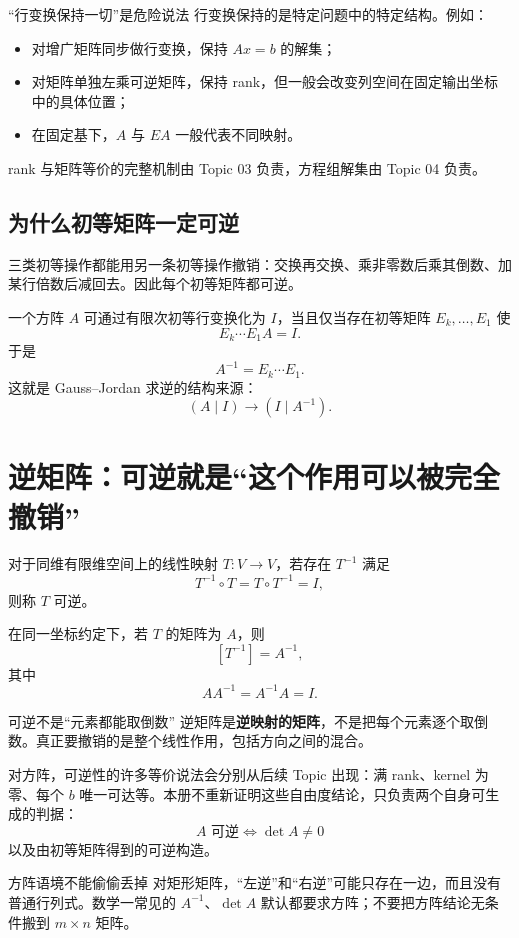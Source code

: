 \documentclass[11pt,a4paper]{ctexart}
\newcommand{\kw}[1]{\textbf{\color{deep}#1}}
\begin{document}
\begin{warnbox}{“行变换保持一切”是危险说法}
行变换保持的是特定问题中的特定结构。例如：
\begin{itemize}
  \item 对增广矩阵同步做行变换，保持 $Ax=b$ 的解集；
  \item 对矩阵单独左乘可逆矩阵，保持 rank，但一般会改变列空间在固定输出坐标中的具体位置；
  \item 在固定基下，$A$ 与 $EA$ 一般代表不同映射。
\end{itemize}
rank 与矩阵等价的完整机制由 Topic 03 负责，方程组解集由 Topic 04 负责。
\end{warnbox}

\subsection{为什么初等矩阵一定可逆}

三类初等操作都能用另一条初等操作撤销：交换再交换、乘非零数后乘其倒数、加某行倍数后减回去。因此每个初等矩阵都可逆。

一个方阵 $A$ 可通过有限次初等行变换化为 $I$，当且仅当存在初等矩阵 $E_k,\dots,E_1$ 使
\[
E_k\cdots E_1A=I.
\]
于是
\[
A^{-1}=E_k\cdots E_1.
\]
这就是 Gauss--Jordan 求逆的结构来源：
\[
(A\mid I)\longrightarrow(I\mid A^{-1}).
\]

\section{逆矩阵：可逆就是“这个作用可以被完全撤销”}

对于同维有限维空间上的线性映射 $T:V\to V$，若存在 $T^{-1}$ 满足
\[
T^{-1}\circ T=T\circ T^{-1}=I,
\]
则称 $T$ 可逆。

在同一坐标约定下，若 $T$ 的矩阵为 $A$，则
\[
[T^{-1}]=A^{-1},
\]
其中
\[
AA^{-1}=A^{-1}A=I.
\]

\begin{corebox}{可逆不是“元素都能取倒数”}
逆矩阵是\kw{逆映射的矩阵}，不是把每个元素逐个取倒数。真正要撤销的是整个线性作用，包括方向之间的混合。
\end{corebox}

对方阵，可逆性的许多等价说法会分别从后续 Topic 出现：满 rank、kernel 为零、每个 $b$ 唯一可达等。本册不重新证明这些自由度结论，只负责两个自身可生成的判据：
\[
\boxed{A\text{ 可逆}\iff \det A\neq0}
\]
以及由初等矩阵得到的可逆构造。

\begin{warnbox}{方阵语境不能偷偷丢掉}
对矩形矩阵，“左逆”和“右逆”可能只存在一边，而且没有普通行列式。数学一常见的 $A^{-1}$、$\det A$ 默认都要求方阵；不要把方阵结论无条件搬到 $m\times n$ 矩阵。
\end{warnbox}
\end{document}

